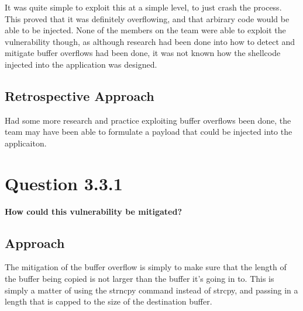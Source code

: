 It was quite simple to exploit this at a simple level, to just crash the
process. This proved that it was definitely overflowing, and that arbirary
code would be able to be injected. None of the members on the team were
able to exploit the vulnerability though, as although research had been done
into how to detect and mitigate buffer overflows had been done, it was not
known how the shellcode injected into the application was designed.

\subsection{Retrospective Approach}
Had some more research and practice exploiting buffer overflows been done, the
team may have been able to formulate a payload that could be injected into
the applicaiton.

\section{Question 3.3.1}
\textbf{How could this vulnerability be mitigated?}
\subsection{Approach}
The mitigation of the buffer overflow is simply to make sure that the length
of the buffer being copied is not larger than the buffer it's going in to.
This is simply a matter of using the strncpy command instead of strcpy, and
passing in a length that is capped to the size of the destination buffer.
